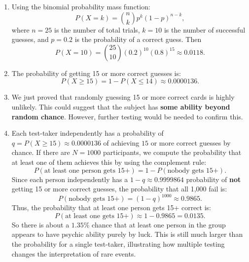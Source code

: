 \documentclass[12pt]{article}
\begin{document}
\begin{enumerate}
\begin{enumerate}
        \item Using the binomial probability mass function:
         $$   
        P(X = k) = \binom{n}{k} p^k (1 - p)^{n-k},
        $$
        where $n = 25$ is the number of total trials, $k = 10$ is the number of successful guesses, and $p = 0.2$ is the probability of a correct guess. Then
        $$
        P(X = 10) = \binom{25}{10} (0.2)^{10} (0.8)^{15} \approx 0.0118.
        $$
        
        \item The probability of getting 15 or more correct guesses is:
        $$
        P(X \geq 15) = 1 - P(X \leq 14) \approx 0.0000136.
        $$

        \item We just proved that randomly guessing 15 or more correct cards is highly unlikely. This could suggest that the subject has \textbf{some ability beyond random chance}. However, further testing would be needed to confirm this.

        \item Each test-taker independently has a probability of
        $
        q = P(X \geq 15) \approx 0.0000136
        $
        of achieving $15$ or more correct guesses by chance. 
        If there are \( N = 1000 \) participants, we compute the probability that at least one of them achieves this by using the complement rule:
        \[
        P(\text{at least one person gets 15+}) = 1 - P(\text{nobody gets 15+}).
        \]
        Since each person independently has a \( 1 - q \approx 0.9999864 \) probability of \textbf{not} getting 15 or more correct guesses, the probability that all 1,000 fail is:
        \[ 
        P(\text{nobody gets 15+}) = (1-q)^{1000} \approx 0.9865.
        \]
        Thus, the probability that at least one person gets 15+ correct is:
        $$
        P(\text{at least one gets 15+}) \approx 1 - 0.9865 = 0.0135.
        $$
        So there is about a $1.35\%$ chance that at least one person in the group appears to have psychic ability purely by luck. This is still much larger than the probability for a single test-taker, illustrating how multiple testing changes the interpretation of rare events.


\end{enumerate}
\end{enumerate}
\end{document}

